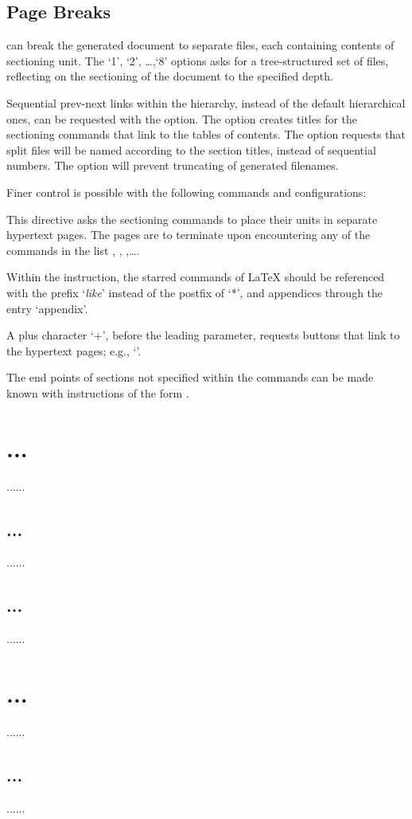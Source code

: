 \section{Page Breaks}

\texfourht{} can break the generated document to separate files, each containing 
contents of sectioning unit. The ‘1’, ‘2’, \ldots ,‘8’ options asks for a
tree-structured set of files, reflecting on the sectioning of the document to
the specified depth. 

Sequential prev-next links within the hierarchy, instead
of the default hierarchical ones, can be requested with the  option.
The option  creates titles for the sectioning commands that link
to the tables of contents. The  option requests that split  files will
be named according to the section titles, instead of sequential numbers. 
The  option will prevent truncating of generated filenames.

Finer control is possible with the following commands and configurations:



This directive asks the sectioning commands  to place their units in
separate hypertext pages. The pages are to terminate upon encountering any of
the commands in the list , , ,\ldots.

Within the  instruction, the starred commands of \LaTeX{} should be
referenced with the prefix ‘\textit{like}’ instead of the postfix of ‘*’, and appendices
through the entry ‘appendix’.

A plus character ‘+’, before the leading parameter, requests buttons that link
to the hypertext pages; e.g., ‘’. 


The end points of sections not specified within the  commands can be made
known with instructions of the form . 

\begin{texsource}
\tableofcontents
\chapter{...}  ......  \section{...}  ......  \section{...}  ......
\chapter{...}  ......  \section{...}  ......
\end{texsource}

